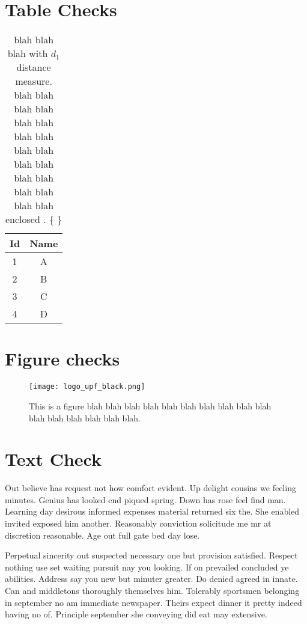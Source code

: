 \section{Table Checks}
\begin{table}[h]
\tabcolsep=0.1cm
\begin{center}
\begin{tabular}{|c|c|}
\hline 
Id & Name \tabularnewline \hline \hline 
1 & A \tabularnewline \hline \hline 
2 & B \tabularnewline \hline \hline 
3 & C \tabularnewline \hline \hline 
4 & D \tabularnewline \hline
\end{tabular}
\end{center}
\caption[In the TOC entry - 2]{blah blah blah  with $d_1$ distance measure. blah blah blah blah blah blah blah blah blah blah blah blah blah blah blah blah blah blah enclosed . \music \{ \} \normalfont}\label{tab:Check2}
\end{table}
\section{Figure checks}
\begin{figure}[ht]
\begin{center}
\texttt{[image: logo\_upf\_black.png]}
\caption[In TOC - correctly]{This is a figure blah blah blah blah blah blah blah blah blah blah blah blah blah blah blah blah.} \label{fig:Check2}
\end{center}
\end{figure}
\section{Text Check}
Out believe has request not how comfort evident. Up delight cousins we feeling minutes. Genius has looked end piqued spring. Down has rose feel find man. Learning day desirous informed expenses material returned six the. She enabled invited exposed him another. Reasonably conviction solicitude me mr at discretion reasonable. Age out full gate bed day lose. 

Perpetual sincerity out suspected necessary one but provision satisfied. Respect nothing use set waiting pursuit nay you looking. If on prevailed concluded ye abilities. Address say you new but minuter greater. Do denied agreed in innate. Can and middletons thoroughly themselves him. Tolerably sportsmen belonging in september no am immediate newspaper. Theirs expect dinner it pretty indeed having no of. Principle september she conveying did eat may extensive. 

